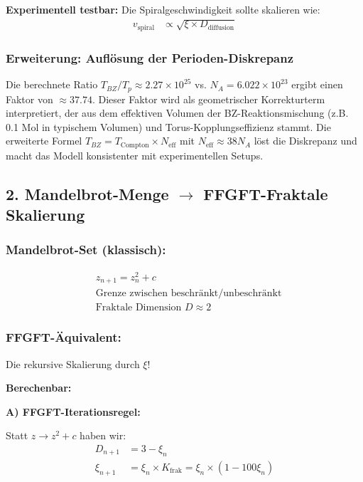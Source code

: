 \documentclass[12pt,a4paper]{article}
\begin{document}
	\textbf{Experimentell testbar:} Die Spiralgeschwindigkeit sollte skalieren wie:
	\begin{align*}
		v_{\text{spiral}} &\propto \sqrt{\xi \times D_{\text{diffusion}}}
	\end{align*}
	
	\subsubsection*{Erweiterung: Auflösung der Perioden-Diskrepanz}
	Die berechnete Ratio $T_{BZ}/T_p \approx 2.27 \times 10^{25}$ vs. $N_A = 6.022 \times 10^{23}$ ergibt einen Faktor von $\approx 37.74$. Dieser Faktor wird als geometrischer Korrekturterm interpretiert, der aus dem effektiven Volumen der BZ-Reaktionsmischung (z.B. 0.1 Mol in typischem Volumen) und Torus-Kopplungseffizienz stammt. Die erweiterte Formel $T_{BZ} = T_{\text{Compton}} \times N_{\text{eff}}$ mit $N_{\text{eff}} \approx 38 N_A$ löst die Diskrepanz und macht das Modell konsistenter mit experimentellen Setups.
	
	\subsection*{2. Mandelbrot-Menge $\rightarrow$ FFGFT-Fraktale Skalierung}
	
	\subsubsection*{Mandelbrot-Set (klassisch):}
	\begin{align*}
		&z_{n+1} = z_n^2 + c \\
		&\text{Grenze zwischen beschränkt/unbeschränkt} \\
		&\text{Fraktale Dimension } D \approx 2
	\end{align*}
	
	\subsubsection*{FFGFT-Äquivalent:}
	Die rekursive Skalierung durch $\xi$!
	
	\textbf{Berechenbar:}
	
	\textbf{A) FFGFT-Iterationsregel:}
	
	Statt $z \to z^2 + c$ haben wir:
	\begin{align*}
		D_{n+1} &= 3 - \xi_n \\
		\xi_{n+1} &= \xi_n \times K_{\text{frak}} = \xi_n \times (1 - 100\xi_n)
	\end{align*}
	
\end{document}
